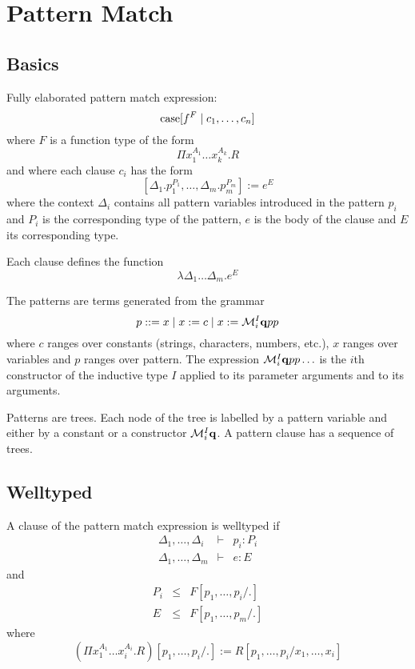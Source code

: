 \section{Pattern Match}


\subsection{Basics}

Fully elaborated pattern match expression:
$$
{\text{case}}[ f^F \mid c_1,  \ldots, c_n]
$$
%
where $F$ is a function type of the form
%
$$
\Pi x_1^{A_1} \ldots x_k^{A_k}. R
$$
%
and where each clause $c_i$ has the form
%
$$
    [\Delta_1. p_1^{P_1}, \ldots, \Delta_m. p_m^{P_m}] := e^E
$$
where the context $\Delta_i$ contains all pattern variables introduced in the
pattern $p_i$
and $P_i$ is the corresponding type of the pattern, $e$ is the body of the
clause and $E$ its corresponding type.

Each clause defines the function
$$
\lambda \Delta_1 \ldots \Delta_m. e^E
$$


The patterns are terms generated from the grammar
$$
    p ::= x \mid x := c \mid x := {\cal M}^I_i {\mathbf q} p p
$$
where $c$ ranges over constants (strings, characters, numbers, etc.), $x$ ranges
over variables and $p$ ranges over pattern. The expression ${\cal M}^I_i {\mathbf q} p p
\ldots$ is the $i$th constructor of the inductive type $I$ applied to its
parameter arguments and to its arguments.

Patterns are trees. Each node of the tree is labelled by a pattern variable and
either by a constant or a constructor ${\cal M}^I_i {\mathbf q}$. A pattern clause has a
sequence of trees.



\subsection{Welltyped}

A clause of the pattern match expression is welltyped if
$$
\begin{array}{lll}
    \Delta_1,\ldots,\Delta_i &\vdash& p_i : P_i
    \\
    \Delta_1,\ldots,\Delta_m &\vdash& e : E
\end{array}
$$
%
and
%
$$
\begin{array}{lll}
    P_i &\le& F[p_1,\ldots,p_i / .]
    \\
    E   &\le& F[p_1,\ldots,p_m / .]
\end{array}
$$
%
where
%
$$
    (\Pi x_1^{A_1} \ldots x_i^{A_i} . R)[p_1,\ldots,p_i/.]
    :=
    R[p_1,\ldots,p_i / x_1,\ldots,x_i]
$$




